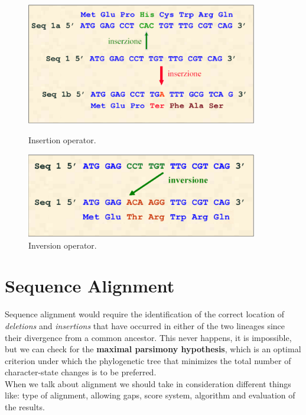 \begin{figure}[h]
	\begin{minipage}[t]{0.5\linewidth}
		\centering
		\includegraphics[width=0.9\textwidth]{img/insertions.png}
		\caption{Insertion operator.}
		\label{f1}
	\end{minipage}
	\hspace{0.1cm}
	\begin{minipage}[t]{0.5\linewidth} 
		\centering
		\includegraphics[width=0.9\textwidth]{img/inversions.png}
		\caption{Inversion operator.}
		\label{f2}
	\end{minipage}        
\end{figure} 


\section{Sequence Alignment}
Sequence alignment would require the identification of the correct location of \textit{deletions} and \textit{insertions} that have occurred in either of the two lineages since their divergence from a common ancestor. This never happens, it is impossible, but we can check for the \textbf{maximal parsimony hypothesis}, which is an optimal criterion under which the phylogenetic tree that minimizes the total number of character-state changes is to be preferred.\\
When we talk about alignment we should take in consideration different things like: type of alignment, allowing gaps, score system, algorithm and evaluation of the results.

